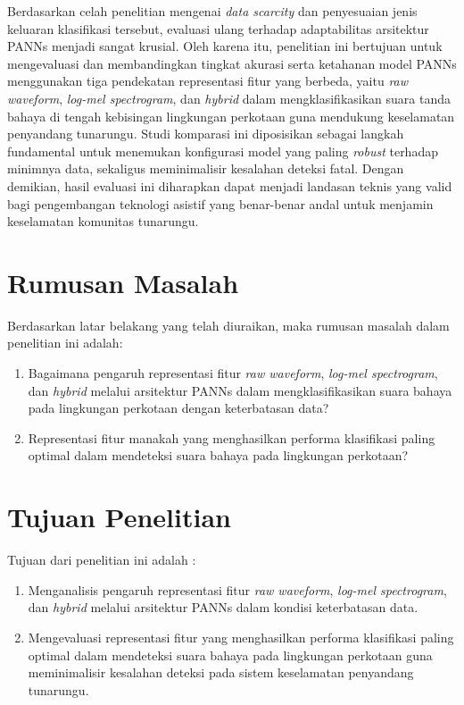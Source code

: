 Berdasarkan celah penelitian mengenai \textit{data scarcity} dan penyesuaian jenis keluaran klasifikasi tersebut, evaluasi ulang terhadap adaptabilitas arsitektur PANNs menjadi sangat krusial.
Oleh karena itu, penelitian ini bertujuan untuk mengevaluasi dan membandingkan tingkat akurasi serta ketahanan model PANNs menggunakan tiga pendekatan representasi fitur yang berbeda, yaitu \textit{raw waveform}, \textit{log-mel spectrogram}, dan \textit{hybrid} dalam mengklasifikasikan suara tanda bahaya di tengah kebisingan lingkungan perkotaan guna mendukung keselamatan penyandang tunarungu. 
Studi komparasi ini diposisikan sebagai langkah fundamental untuk menemukan konfigurasi model yang paling \textit{robust} terhadap minimnya data, sekaligus meminimalisir kesalahan deteksi fatal. 
Dengan demikian, hasil evaluasi ini diharapkan dapat menjadi landasan teknis yang valid bagi pengembangan teknologi asistif yang benar-benar andal untuk menjamin keselamatan komunitas tunarungu. \par
 
\section{Rumusan Masalah} \label{I.Rumusan Masalah}
Berdasarkan latar belakang yang telah diuraikan, maka rumusan masalah dalam penelitian ini adalah: \par

\begin{enumerate}[noitemsep]
  \item Bagaimana pengaruh representasi fitur \textit{raw waveform}, \textit{log-mel spectrogram}, dan \textit{hybrid} melalui arsitektur PANNs dalam mengklasifikasikan suara bahaya pada lingkungan perkotaan dengan keterbatasan data?
  \item Representasi fitur manakah yang menghasilkan performa klasifikasi paling optimal dalam mendeteksi suara bahaya pada lingkungan perkotaan?
\end{enumerate}


\section{Tujuan Penelitian} \label{I.Tujuan}
Tujuan dari penelitian ini adalah : \par

\begin{enumerate}[noitemsep]
  \item Menganalisis pengaruh representasi fitur \textit{raw waveform}, \textit{log-mel spectrogram}, dan \textit{hybrid} melalui arsitektur PANNs dalam kondisi keterbatasan data.
  \item Mengevaluasi representasi fitur yang menghasilkan performa klasifikasi paling optimal dalam mendeteksi suara bahaya pada lingkungan perkotaan guna meminimalisir kesalahan deteksi pada sistem keselamatan penyandang tunarungu.
\end{enumerate}


